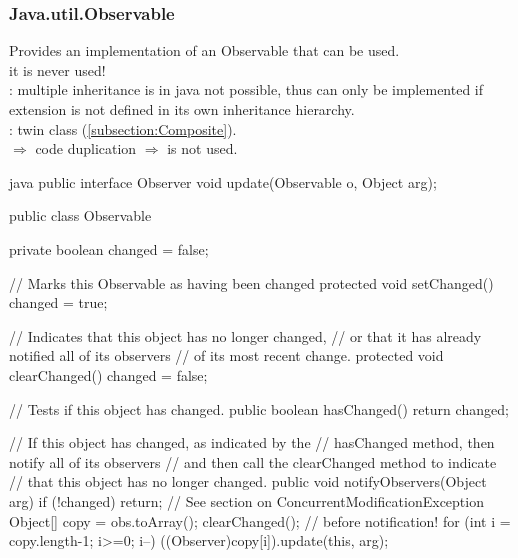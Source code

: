 \subsubsection{Java.util.Observable}
\label{subsubsec:Java.util.Observable}
\begin{sectionbox}\nospacing
  Provides an implementation of an Observable that can be used.\\
   it is never used!\\
  : multiple inheritance is in java not possible, thus
   can only be implemented if extension is not
  defined in its own inheritance hierarchy.\\
  :  twin class (\cref{subsection:Composite}).\\
    $\Rightarrow$ code duplication $\Rightarrow$ 
  is not used.
\end{sectionbox}
\begin{codeboxNl}{java}
public interface Observer {
  void update(Observable o, Object arg);
}

public class Observable {
  private boolean changed = false;

  // Marks this Observable as having been changed
  protected void setChanged() { changed = true; }

  // Indicates that this object has no longer changed,
  // or that it has already notified all of its observers
  // of its most recent change.
  protected void clearChanged() { changed = false; }

  // Tests if this object has changed.
  public boolean hasChanged() { return changed; }

  // If this object has changed, as indicated by the
  // hasChanged method, then notify all of its observers
  // and then call the clearChanged method to indicate
  // that this object has no longer changed.
  public void notifyObservers(Object arg) {
    if (!changed) return;
    // See section on ConcurrentModificationException
    Object[] copy = obs.toArray();
    clearChanged(); // before notification!
    for (int i = copy.length-1; i>=0; i--)
      ((Observer)copy[i]).update(this, arg);
  }
}
\end{codeboxNl}
